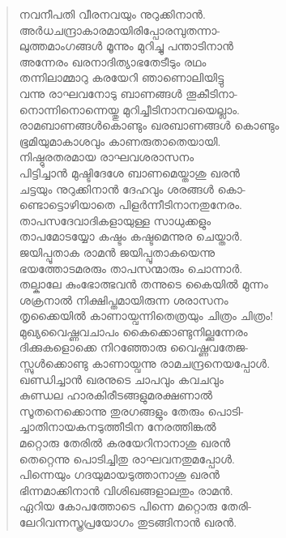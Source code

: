 \begin{verse}
നവനീപതി വീരനവയും നുറുക്കിനാന്‍.\\
അര്‍ധചന്ദ്രാകാരമായിരിപ്പോരമ്പുതന്നാ-\\
ലുത്തമാംഗങ്ങള്‍ മൂന്നും മുറിച്ചു പന്താടിനാന്‍\\
അന്നേരം ഖരനാദിത്യാഭതേടീടും രഥം\\
തന്നിലാമ്മാറു കരയേറി ഞാണൊലിയിട്ടു\\
വന്നു രാഘവനോടു ബാണങ്ങള്‍ തൂകീടിനാ-\\
നൊന്നിനൊന്നെയ്തു മുറിച്ചീടിനാനവയെല്ലാം.\\
രാമബാണങ്ങള്‍കൊണ്ടും ഖരബാണങ്ങള്‍ കൊണ്ടും\\
ഭൂമിയുമാകാശവും കാണരുതാതെയായി.\\
നിഷ്ഠുരതരമായ രാഘവശരാസനം\\
പിട്ടിച്ചാന്‍ മുഷ്ടിദേശേ ബാണമെയ്താശു ഖരന്‍\\
ചട്ടയും നുറുക്കിനാന്‍ ദേഹവും ശരങ്ങള്‍ കൊ-\\
ണ്ടൊട്ടൊഴിയാതെ പിളര്‍ന്നീടിനാനതുനേരം.\\
താപസദേവാദികളായുള്ള സാധുക്കളും\\
താപമോടയ്യോ കഷ്ടം കഷ്ടമെന്നുര ചെയ്താര്‍.\\
ജയിപ്പൂതാക രാമന്‍ ജയിപ്പൂതാകയെന്നു\\
ഭയത്തോടമരരും താപസന്മാരും ചൊന്നാര്‍.\\
തല്കാലേ കുംഭോത്ഭവന്‍ തന്നുടെ കൈയില്‍ മുന്നം\\
ശക്രനാല്‍ നിക്ഷിപ്തമായിരുന്ന ശരാസനം\\
തൃക്കൈയില്‍ കാണായ്വന്നിതെത്രയും ചിത്രം ചിത്രം!\\
മുഖ്യവൈഷ്ണവചാപം കൈക്കൊണ്ടുനില്ക്കുന്നേരം\\
ദിക്കുകളൊക്കെ നിറഞ്ഞോരു വൈഷ്ണവതേജ-\\
സ്സുള്‍ക്കൊണ്ടു കാണായ്വന്നു രാമചന്ദ്രനെയപ്പോള്‍.\\
ഖണ്ഡിച്ചാന്‍ ഖരനുടെ ചാപവും കവചവും\\
കുണ്ഡല ഹാരകിരീടങ്ങളുമരക്ഷണാല്‍\\
സൂതനെക്കൊന്നു തുരഗങ്ങളും തേരും പൊടി-\\
ച്ചാതിനായകനടുത്തീടിന നേരത്തിങ്കല്‍\\
മറ്റൊരു തേരില്‍ കരയേറിനാനാശു ഖരന്‍\\
തെറ്റെന്നു പൊടിച്ചിതു രാഘവനതുമപ്പോള്‍.\\
പിന്നെയും ഗദയുമായടുത്താനാശു ഖരന്‍\\
ഭിന്നമാക്കിനാന്‍ വിശിഖങ്ങളാലതും രാമന്‍.\\
ഏറിയ കോപത്തോടെ പിന്നെ മറ്റൊരു തേരി-\\
ലേറിവന്നസ്ത്രപ്രയോഗം തുടങ്ങിനാന്‍ ഖരന്‍.\\

\end{verse}
